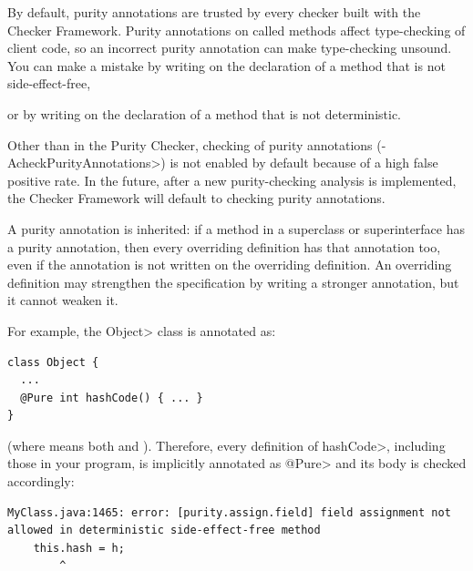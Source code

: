 
By default, purity annotations are trusted by every checker built with the
Checker Framework.  Purity annotations on called methods affect
type-checking of client code, so an incorrect purity annotation can make
type-checking unsound.  You can make a
mistake
%
by writing  on the
declaration of a method that is not side-effect-free,
%

or
%
by writing  on the
declaration of a method that is not deterministic.

Other than in the Purity Checker, checking of purity annotations
(\<-AcheckPurityAnnotations>) is not enabled by default because of a high
false positive rate.  In the future,
after a new purity-checking analysis is implemented, the Checker Framework
will default to checking purity annotations.



A purity annotation is inherited:  if a method in a superclass or
superinterface has a purity annotation, then every overriding definition has
that annotation too, even if the annotation is not written on the overriding
definition.  An overriding definition may strengthen the specification by
writing a stronger annotation, but it cannot weaken it.

For example, the \<Object> class is annotated as:

\begin{Verbatim}
class Object {
  ...
  @Pure int hashCode() { ... }
}
\end{Verbatim}

\noindent
(where  means both
 and
).  Therefore, every definition
of \<hashCode>, including those in your program, is implicitly annotated
as \<@Pure> and its body is checked accordingly:

\begin{mysmall}
\begin{Verbatim}
MyClass.java:1465: error: [purity.assign.field] field assignment not allowed in deterministic side-effect-free method
    this.hash = h;
        ^
\end{Verbatim}
\end{mysmall}

